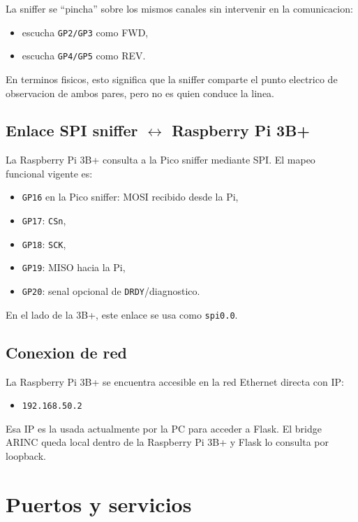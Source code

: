 \documentclass[12pt,a4paper]{report}
\begin{document}
La sniffer se ``pincha'' sobre los mismos canales sin intervenir en la comunicacion:

\begin{itemize}
    \item escucha \texttt{GP2/GP3} como FWD,
    \item escucha \texttt{GP4/GP5} como REV.
\end{itemize}

En terminos fisicos, esto significa que la sniffer comparte el punto electrico de observacion de ambos pares, pero no es quien conduce la linea.

\section{Enlace SPI sniffer $\leftrightarrow$ Raspberry Pi 3B+}

La Raspberry Pi 3B+ consulta a la Pico sniffer mediante SPI. El mapeo funcional vigente es:

\begin{itemize}
    \item \texttt{GP16} en la Pico sniffer: MOSI recibido desde la Pi,
    \item \texttt{GP17}: \texttt{CSn},
    \item \texttt{GP18}: \texttt{SCK},
    \item \texttt{GP19}: MISO hacia la Pi,
    \item \texttt{GP20}: senal opcional de \texttt{DRDY}/diagnostico.
\end{itemize}

En el lado de la 3B+, este enlace se usa como \texttt{spi0.0}.

\section{Conexion de red}

La Raspberry Pi 3B+ se encuentra accesible en la red Ethernet directa con IP:

\begin{itemize}
    \item \texttt{192.168.50.2}
\end{itemize}

Esa IP es la usada actualmente por la PC para acceder a Flask. El bridge ARINC queda local dentro de la Raspberry Pi 3B+ y Flask lo consulta por loopback.

\chapter{Puertos y servicios}
\end{document}
